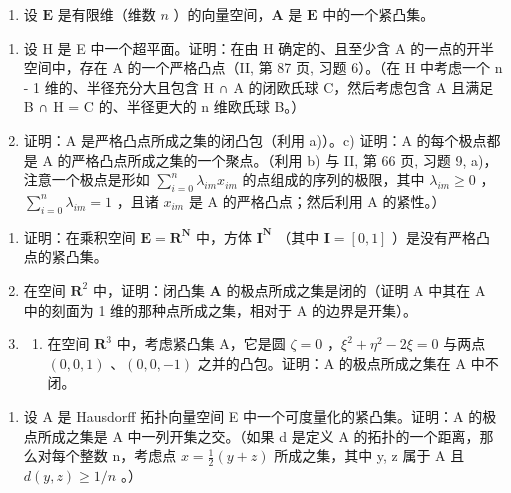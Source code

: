 \begin{enumerate}
\def\labelenumi{\arabic{enumi})}
\setcounter{enumi}{7}
\tightlist
\item
  设 \(\mathbf{E}\) 是有限维（维数 \(n\) ）的向量空间，\(\mathbf{A}\) 是 \(\mathbf{E}\) 中的一个紧凸集。
\end{enumerate}

\begin{enumerate}
\def\labelenumi{\alph{enumi})}
\item
  设 H 是 E 中一个超平面。证明：在由 H 确定的、且至少含 A 的一点的开半空间中，存在 A 的一个严格凸点（II, 第 87 页, 习题 6）。（在 H 中考虑一个 n - 1 维的、半径充分大且包含 H ∩ A 的闭欧氏球 C，然后考虑包含 A 且满足 B ∩ H = C 的、半径更大的 n 维欧氏球 B。）
\item
  证明：A 是严格凸点所成之集的闭凸包（利用 a)）。c) 证明：A 的每个极点都是 A 的严格凸点所成之集的一个聚点。（利用 b) 与 II, 第 66 页, 习题 9, a)，注意一个极点是形如 \(\sum_{i=0}^{n} \lambda_{im} x_{im}\) 的点组成的序列的极限，其中 \(\lambda_{im} \geqslant 0\) ，\(\sum_{i=0}^{n} \lambda_{im} = 1\) ，且诸 \(x_{im}\) 是 A 的严格凸点；然后利用 A 的紧性。）
\end{enumerate}

\begin{enumerate}
\def\labelenumi{\arabic{enumi})}
\setcounter{enumi}{8}
\item
  证明：在乘积空间 \(\mathbf{E} = \mathbf{R}^{\mathbf{N}}\) 中，方体 \(\mathbf{I}^{\mathbf{N}}\) （其中 \(\mathbf{I} = [0,1]\) ）是没有严格凸点的紧凸集。
\item
  在空间 \(\mathbf{R}^2\) 中，证明：闭凸集 \(\mathbf{A}\) 的极点所成之集是闭的（证明 A 中其在 A 中的刻面为 1 维的那种点所成之集，相对于 A 的边界是开集）。
\item
  \begin{enumerate}
  \def\labelenumii{\alph{enumii})}
  \tightlist
  \item
    在空间 \(\mathbf{R}^3\) 中，考虑紧凸集 A，它是圆 \(\zeta = 0\) ，\(\xi^2 + \eta^2 - 2\xi = 0\) 与两点 \((0, 0, 1)\) 、\((0, 0, -1)\) 之并的凸包。证明：A 的极点所成之集在 A 中不闭。
  \end{enumerate}
\end{enumerate}

\begin{enumerate}
\def\labelenumi{\alph{enumi})}
\setcounter{enumi}{1}
\tightlist
\item
  设 A 是 Hausdorff 拓扑向量空间 E 中一个可度量化的紧凸集。证明：A 的极点所成之集是 A 中一列开集之交。（如果 d 是定义 A 的拓扑的一个距离，那么对每个整数 n，考虑点 \(x = \frac{1}{2}(y + z)\) 所成之集，其中 y, z 属于 A 且 \(d(y, z) \geqslant 1/n\) 。）
\end{enumerate}

